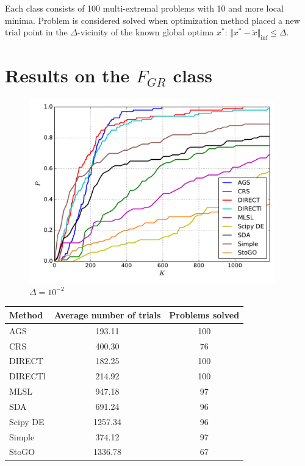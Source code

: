 \documentclass[a4paper]{article}
\begin{document}
Each class consists of 100 multi-extremal problems with 10 and more local minima. Problem is considered solved when optimization method placed a new trial point in the $\Delta$-vicinity of the known global optima $x^*$: $\Vert x^* - \widetilde{x} \Vert_{\inf} \le \Delta$.


\section{Results on the $F_{GR}$ class}

\begin{figure}[H]
  \center
  \includegraphics[width=0.95\textwidth]{../experiments/grish/cmc.pdf}
  \caption{$\Delta=10^{-2}$}
\end{figure}

\begin{tabular}{lcc}
\hline
 Method   &  Average number of trials  &  Problems solved  \\
\hline
 AGS      &           193.11           &        100        \\
 CRS      &           400.30           &        76         \\
 DIRECT   &           182.25           &        100        \\
 DIRECTl  &           214.92           &        100        \\
 MLSL     &           947.18           &        97         \\
 SDA      &           691.24           &        96         \\
 Scipy DE &          1257.34           &        96         \\
 Simple   &           374.12           &        97         \\
 StoGO    &          1336.78           &        67         \\
\hline
\end{tabular}
\end{document}
